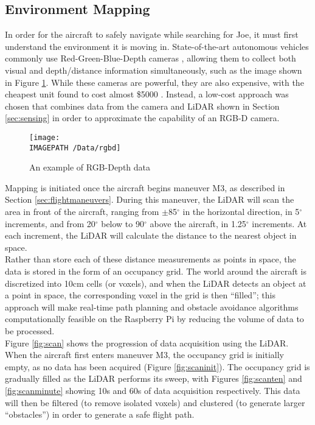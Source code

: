 \subsection{Environment Mapping}
In order for the aircraft to safely navigate while searching for Joe, it must first understand the environment it is moving in. State-of-the-art autonomous vehicles commonly use Red-Green-Blue-Depth cameras \cite{ref:rgbd}, allowing them to collect both visual and depth/distance information simultaneously, such as the image shown in Figure \ref{fig:rgbd}. While these cameras are powerful, they are also expensive, with the cheapest unit found to cost almost \$5000 \cite{ref:rgbdcost}. Instead, a low-cost approach was chosen that combines data from the camera and LiDAR shown in Section \ref{sec:sensing} in order to approximate the capability of an RGB-D camera.\\

\begin{figure}[!ht]
	\centering
	\texttt{[image: \\IMAGEPATH /Data/rgbd]}
	\caption{An example of RGB-Depth data}
	\label{fig:rgbd}
\end{figure}

Mapping is initiated once the aircraft begins maneuver M3, as described in Section \ref{sec:flightmaneuvers}. During this maneuver, the LiDAR will scan the area in front of the aircraft, ranging from $\pm$85$^\circ$ in the horizontal direction, in 5$^\circ$ increments, and from 20$^\circ$ below to 90$^\circ$ above the aircraft, in 1.25$^\circ$ increments. At each increment, the LiDAR will calculate the distance to the nearest object in space.\\

Rather than store each of these distance measurements as points in space, the data is stored in the form of an occupancy grid. The world around the aircraft is discretized into 10cm cells (or voxels), and when the LiDAR detects an object at a point in space, the corresponding voxel in the grid is then ``filled''; this approach will make real-time path planning and obstacle avoidance algorithms computationally feasible on the Raspberry Pi by reducing the volume of data to be processed.\\

Figure \ref{fig:scan} shows the progression of data acquisition using the LiDAR. When the aircraft first enters maneuver M3, the occupancy grid is initially empty, as no data has been acquired (Figure \ref{fig:scaninit}). The occupancy grid is gradually filled as the LiDAR performs its sweep, with Figures \ref{fig:scanten} and \ref{fig:scanminute} showing 10s and 60s of data acquisition respectively. This data will then be filtered (to remove isolated voxels) and clustered (to generate larger ``obstacles'') in order to generate a safe flight path.

